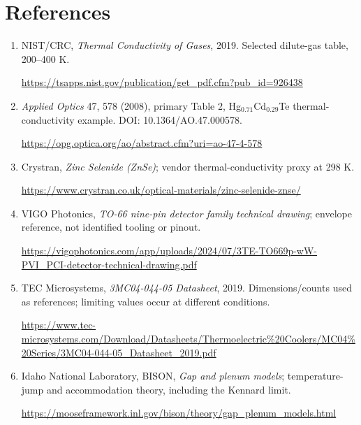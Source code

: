 \documentclass[11pt,a4paper]{article}
\begin{document}
\section{References}
\begin{enumerate}
\item\label{ref:gas} NIST/CRC, \emph{Thermal Conductivity of Gases}, 2019. Selected dilute-gas table, 200--400 K.\par\url{https://tsapps.nist.gov/publication/get_pdf.cfm?pub_id=926438}
\item\label{ref:mct} \emph{Applied Optics} 47, 578 (2008), primary Table 2, Hg$_{0.71}$Cd$_{0.29}$Te thermal-conductivity example. DOI: 10.1364/AO.47.000578.\par\url{https://opg.optica.org/ao/abstract.cfm?uri=ao-47-4-578}
\item\label{ref:znse} Crystran, \emph{Zinc Selenide (ZnSe)}; vendor thermal-conductivity proxy at 298 K.\par\url{https://www.crystran.co.uk/optical-materials/zinc-selenide-znse/}
\item\label{ref:drawing} VIGO Photonics, \emph{TO-66 nine-pin detector family technical drawing}; envelope reference, not identified tooling or pinout.\par\url{https://vigophotonics.com/app/uploads/2024/07/3TE-TO669p-wW-PVI_PCI-detector-technical-drawing.pdf}
\item TEC Microsystems, \emph{3MC04-044-05 Datasheet}, 2019. Dimensions/counts used as references; limiting values occur at different conditions.\par\url{https://www.tec-microsystems.com/Download/Datasheets/Thermoelectric%20Coolers/MC04%20Series/3MC04-044-05_Datasheet_2019.pdf}
\item\label{ref:gap} Idaho National Laboratory, BISON, \emph{Gap and plenum models}; temperature-jump and accommodation theory, including the Kennard limit.\par\url{https://mooseframework.inl.gov/bison/theory/gap_plenum_models.html}
\end{enumerate}
\end{document}
